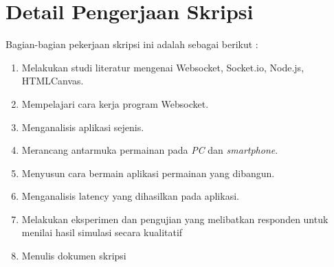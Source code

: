 \documentclass[a4paper,twoside]{article}
\begin{document}
\section{Detail Pengerjaan Skripsi}

Bagian-bagian pekerjaan skripsi ini adalah sebagai berikut :
	\begin{enumerate}
		\item Melakukan studi literatur mengenai Websocket, Socket.io, Node.js, HTMLCanvas.
		\item Mempelajari cara kerja program Websocket.
		\item Menganalisis aplikasi sejenis.
		\item Merancang antarmuka permainan pada \textit{PC} dan \textit{smartphone}.
		\item Menyusun cara bermain aplikasi permainan yang dibangun.
		\item Menganalisis latency yang dihasilkan pada aplikasi.
		\item Melakukan eksperimen dan pengujian yang melibatkan responden untuk menilai hasil simulasi secara kualitatif
		\item Menulis dokumen skripsi
	\end{enumerate}
\end{document}
